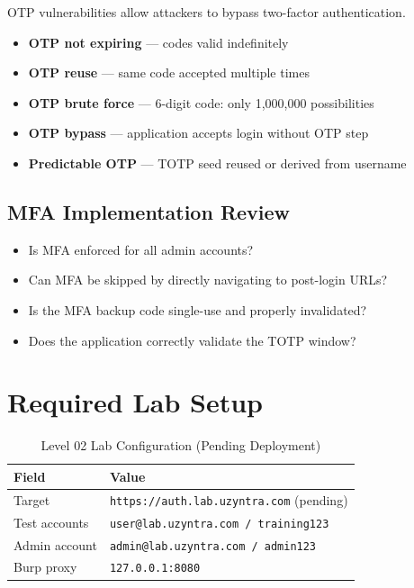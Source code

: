 OTP vulnerabilities allow attackers to bypass two-factor authentication.

\begin{itemize}
  \item \textbf{OTP not expiring} — codes valid indefinitely
  \item \textbf{OTP reuse} — same code accepted multiple times
  \item \textbf{OTP brute force} — 6-digit code: only 1,000,000 possibilities
  \item \textbf{OTP bypass} — application accepts login without OTP step
  \item \textbf{Predictable OTP} — TOTP seed reused or derived from username
\end{itemize}

\subsection{MFA Implementation Review}

\begin{itemize}
  \item Is MFA enforced for all admin accounts?
  \item Can MFA be skipped by directly navigating to post-login URLs?
  \item Is the MFA backup code single-use and properly invalidated?
  \item Does the application correctly validate the TOTP window?
\end{itemize}

\section{Required Lab Setup}

\begin{table}[H]
\centering
\caption{Level 02 Lab Configuration (Pending Deployment)}
\begin{tabular}{ll}
\toprule
Field & Value \\
\midrule
Target & \texttt{https://auth.lab.uzyntra.com} (pending) \\
Test accounts & \texttt{user@lab.uzyntra.com / training123} \\
Admin account & \texttt{admin@lab.uzyntra.com / admin123} \\
Burp proxy & \texttt{127.0.0.1:8080} \\
\bottomrule
\end{tabular}
\end{table}

